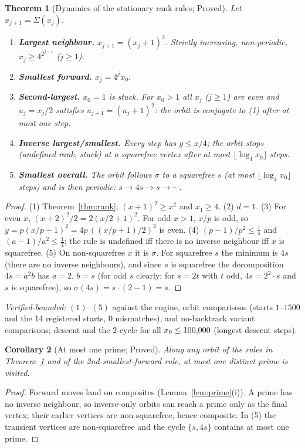 \documentclass[11pt]{article}
\newtheorem{theorem}{Theorem}\newtheorem{proposition}[theorem]{Proposition}\newtheorem{lemma}[theorem]{Lemma}\newtheorem{corollary}[theorem]{Corollary}
\theoremstyle{remark}\newtheorem{remark}[theorem]{Remark}
\begin{document}
\begin{theorem}[Dynamics of the stationary rank rules; Proved]\label{thm:dyn}
Let $x_{j+1}=\Sigma(x_j)$.
\begin{enumerate}[itemsep=1pt]
\item \textbf{Largest neighbour.} $x_{j+1}=(x_j+1)^2$. Strictly increasing, non-periodic, $x_j\ge4^{2^{j-1}}$ ($j\ge1$).
\item \textbf{Smallest forward.} $x_j=4^jx_0$.
\item \textbf{Second-largest.} $x_0=1$ is stuck. For $x_0>1$ all $x_j$ ($j\ge1$) are even and $u_j=x_j/2$ satisfies $u_{j+1}=(u_j+1)^2$: the orbit is conjugate to (1) after at most one step.
\item \textbf{Inverse largest/smallest.} Every step has $y\le x/4$; the orbit stops (undefined rank, \emph{stuck}) at a squarefree vertex after at most $\lfloor\log_4x_0\rfloor$ steps.
\item \textbf{Smallest overall.} The orbit follows $\sigma$ to a squarefree $s$ (at most $\lfloor\log_4x_0\rfloor$ steps) and is then periodic: $s\to4s\to s\to\cdots$.
\end{enumerate}
\end{theorem}
\begin{proof}(1) Theorem~\ref{thm:rank}; $(x+1)^2\ge x^2$ and $x_1\ge4$. (2) $d=1$. (3) For even $x$, $(x+2)^2/2=2(x/2+1)^2$. For odd $x>1$, $x/p$ is odd, so $y=p(x/p+1)^2=4p\,((x/p+1)/2)^2$ is even. (4) $(p-1)/p^2\le\frac14$ and $(a-1)/a^2\le\frac14$; the rule is undefined iff there is no inverse neighbour iff $x$ is squarefree. (5) On non-squarefree $x$ it is $\sigma$. For squarefree $s$ the minimum is $4s$ (there are no inverse neighbours), and since $s$ is squarefree the decomposition $4s=a^2b$ has $a=2$, $b=s$ (for odd $s$ clearly; for $s=2t$ with $t$ odd, $4s=2^2\cdot s$ and $s$ is squarefree), so $\sigma(4s)=s\cdot(2-1)=s$.\end{proof}
\textit{Verified-bounded:} $\mathrm{(1)}$--$\mathrm{(5)}$ against the engine, \ProvedCmp{} orbit comparisons (starts $1$--$1500$ and the 14 registered starts, 0 mismatches), and \NbCmp{} no-backtrack variant comparisons; descent and the 2-cycle for all $x_0\le100{,}000$ (longest descent \MaxSteps{} steps).

\begin{corollary}[At most one prime; Proved]\label{cor:one}
Along any orbit of the rules in Theorem~\ref{thm:dyn} and of the 2nd-smallest-forward rule, at most one distinct prime is visited.
\end{corollary}
\begin{proof}Forward moves land on composites (Lemma~\ref{lem:prime}(i)). A prime has no inverse neighbour, so inverse-only orbits can reach a prime only as the final vertex; their earlier vertices are non-squarefree, hence composite. In (5) the transient vertices are non-squarefree and the cycle $\{s,4s\}$ contains at most one prime.\end{proof}
\end{document}
